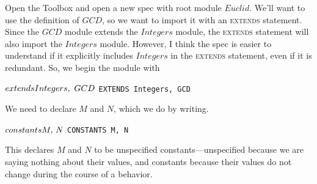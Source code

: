 Open the Toolbox and open a new spec with root module $Euclid$.  We'll
want to use the definition of $GCD$, so we want to import it with an
\textsc{extends} statement.  Since the $GCD$ module extends the
$Integers$ module, the \textsc{extends} statement will also import the
$Integers$ module.  However, I think the spec is easier to understand
if it explicitly includes $Integers$ in the \textsc{extends}
statement, even if it is redundant.  So, we begin the module with
\begin{twocols}
$\EXTENDS Integers,\ GCD$
 \midcol
\verb|EXTENDS Integers, GCD|
\end{twocols}
We need to declare $M$ and $N$, which we do by writing.%
%
\begin{twocols} 
$\CONSTANTS M,\, N$%
 \midcol 
\tt CONSTANTS M, N 
\end{twocols}
This declares $M$ and $N$ to be
unspecified constants---unspecified because we are saying nothing
about their values, and constants because their values do not change
during the course of a behavior.

